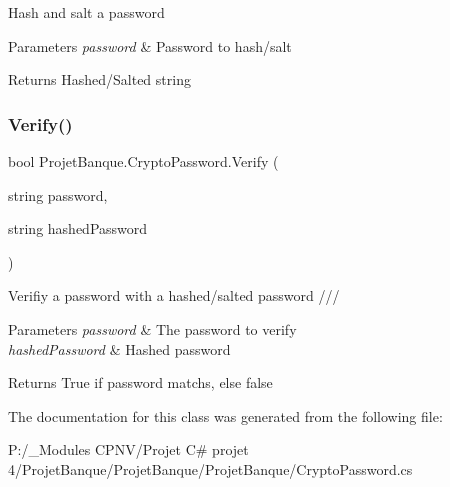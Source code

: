 Hash and salt a password 


\begin{DoxyParams}{Parameters}
{\em password} & Password to hash/salt\\
\hline
\end{DoxyParams}
\begin{DoxyReturn}{Returns}
Hashed/\+Salted string
\end{DoxyReturn}
\mbox{\label{class_projet_banque_1_1_crypto_password_a386f50e2b9d7b64fb52a3f56a638a2bd}} 
\subsubsection{\texorpdfstring{Verify()}{Verify()}}
{\footnotesize\ttfamily bool Projet\+Banque.\+Crypto\+Password.\+Verify (\begin{DoxyParamCaption}\item[{string}]{password,  }\item[{string}]{hashed\+Password }\end{DoxyParamCaption})}



Verifiy a password with a hashed/salted password /// 


\begin{DoxyParams}{Parameters}
{\em password} & The password to verify\\
\hline
{\em hashed\+Password} & Hashed password\\
\hline
\end{DoxyParams}
\begin{DoxyReturn}{Returns}
True if password matchs, else false
\end{DoxyReturn}


The documentation for this class was generated from the following file\+:\begin{DoxyCompactItemize}
\item 
P\+:/\+\_\+\+Modules C\+P\+N\+V/\+Projet C\# projet 4/\+Projet\+Banque/\+Projet\+Banque/\+Projet\+Banque/Crypto\+Password.\+cs\end{DoxyCompactItemize}
